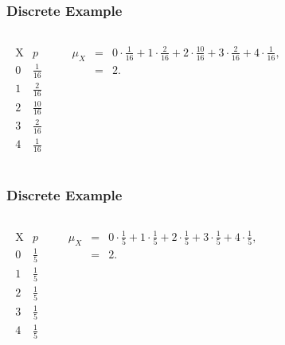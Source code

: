 \begin{frame}
  \frametitle{Discrete Example}


   \begin{columns}
     \begin{eqnarray*}
       \begin{array}{r|l}
         \mathrm{X} & p \\ \hline
          0 & \frac{1}{16}  \\ [5pt]
          1 & \frac{2}{16}  \\ [5pt]
          2 & \frac{10}{16} \\ [5pt]
          3 & \frac{2}{16} \\ [5pt]
          4 & \frac{1}{16}
       \end{array}
     \end{eqnarray*}

     {
       \begin{eqnarray*}
         \mu_X & = & 0 \cdot \frac{1}{16} + 1 \cdot \frac{2}{16} + 2 \cdot \frac{10}{16} + 3 \cdot \frac{2}{16} + 4 \cdot \frac{1}{16}, \\
         & = & 2.
       \end{eqnarray*}
     }

   \end{columns}

  
\end{frame}


\begin{frame}
  \frametitle{Discrete Example}


   \begin{columns}
     \begin{eqnarray*}
       \begin{array}{r|l}
         \mathrm{X} & p \\ \hline
          0 & \frac{1}{5} \\ [5pt]
          1 & \frac{1}{5} \\ [5pt]
          2 & \frac{1}{5} \\ [5pt]
          3 & \frac{1}{5} \\ [5pt]
          4 & \frac{1}{5}
       \end{array}
     \end{eqnarray*}

     {
       \begin{eqnarray*}
         \mu_X & = & 0 \cdot \frac{1}{5} + 1 \cdot \frac{1}{5} + 2 \cdot \frac{1}{5} + 3 \cdot \frac{1}{5} + 4 \cdot \frac{1}{5}, \\
         & = & 2.
       \end{eqnarray*}
     }

   \end{columns}

  
\end{frame}

